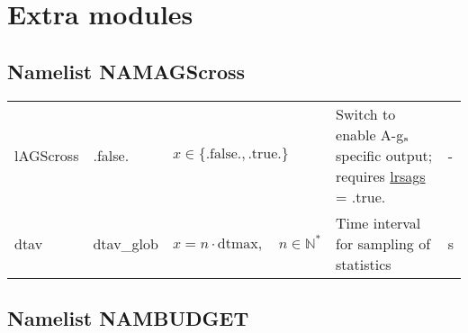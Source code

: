 \documentclass[twoside,11pt,fleqn,a4paper,english,openright]{report}
\begin{document}
\newpage
\section{Extra modules}\label{par:extramod}

\subsection{Namelist NAMAGScross}\label{par:agscross}

\begin{center}
  \tablelasttail{
        &&&&\\\hline
  }
\begin{supertabular}{|l|p{2cm}|p{4cm}|p{6cm}|l|}
  lAGScross	& .false.	& $x\in\{\text{.false.},\text{.true.}\}$		& Switch to enable A-g$\rm_s$ specific output; requires \hyperlink{lrsags}{lrsags} = .true.	& -\\
  dtav		& dtav\_glob	& $x = n \cdot \text{dtmax}, \quad n \in \mathbb{N}^*$	& Time interval for sampling of statistics	& s\\
\end{supertabular}
\end{center}

\subsection{Namelist NAMBUDGET}\label{par:budget}
\end{document}
